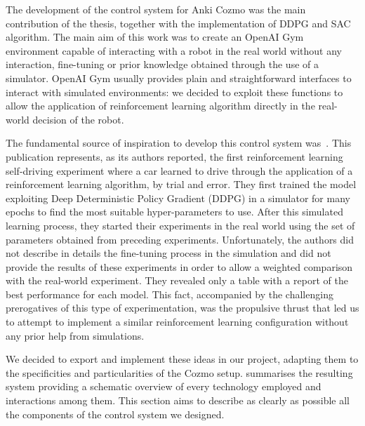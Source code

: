 The development of the control system for Anki Cozmo was the main contribution of the thesis, together with the implementation of DDPG and SAC algorithm.
The main aim of this work was to create an OpenAI Gym environment capable of interacting with a robot in the real world without any interaction, fine-tuning or prior knowledge obtained through the use of a simulator.
OpenAI Gym usually provides plain and straightforward interfaces to interact with simulated environments: we decided to exploit these functions to allow the application of reinforcement learning algorithm directly in the real-world decision of the robot.


The fundamental source of inspiration to develop this control system was~\cite{kendall2018learning,kendall2019learning}.
This publication represents, as its authors reported, the first reinforcement learning self-driving experiment where a car learned to drive through the application of a reinforcement learning algorithm, by trial and error.
They first trained the model exploiting Deep Deterministic Policy Gradient (DDPG) in a simulator for many epochs to find the most suitable hyper-parameters to use.
After this simulated learning process, they started their experiments in the real world using the set of parameters obtained from preceding experiments.
Unfortunately, the authors did not describe in details the fine-tuning process in the simulation and did not provide the results of these experiments in order to allow a weighted comparison with the real-world experiment.
They revealed only a  table with a report of the best performance for each model.
This fact, accompanied by the challenging prerogatives of this type of experimentation, was the propulsive thrust that led us to attempt to implement a similar reinforcement learning configuration without any prior help from simulations.

We decided to export and implement these ideas in our project, adapting them to the specificities and particularities of the Cozmo setup.
 summarises the resulting system providing a schematic overview of every technology employed and interactions among them.
This section aims to describe as clearly as possible all the components of the control system we designed.


